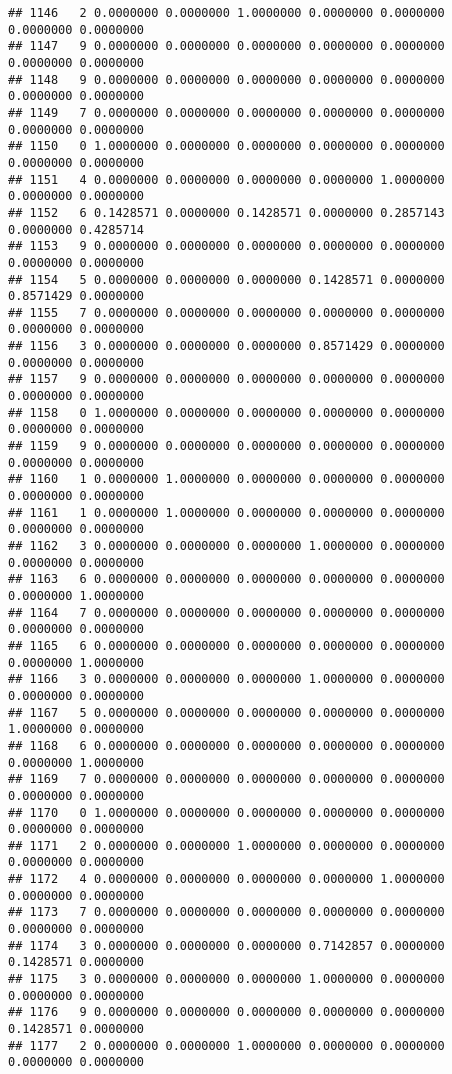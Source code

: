 \documentclass[
]{article}
\begin{document}
\begin{verbatim}
## 1146   2 0.0000000 0.0000000 1.0000000 0.0000000 0.0000000 0.0000000 0.0000000
## 1147   9 0.0000000 0.0000000 0.0000000 0.0000000 0.0000000 0.0000000 0.0000000
## 1148   9 0.0000000 0.0000000 0.0000000 0.0000000 0.0000000 0.0000000 0.0000000
## 1149   7 0.0000000 0.0000000 0.0000000 0.0000000 0.0000000 0.0000000 0.0000000
## 1150   0 1.0000000 0.0000000 0.0000000 0.0000000 0.0000000 0.0000000 0.0000000
## 1151   4 0.0000000 0.0000000 0.0000000 0.0000000 1.0000000 0.0000000 0.0000000
## 1152   6 0.1428571 0.0000000 0.1428571 0.0000000 0.2857143 0.0000000 0.4285714
## 1153   9 0.0000000 0.0000000 0.0000000 0.0000000 0.0000000 0.0000000 0.0000000
## 1154   5 0.0000000 0.0000000 0.0000000 0.1428571 0.0000000 0.8571429 0.0000000
## 1155   7 0.0000000 0.0000000 0.0000000 0.0000000 0.0000000 0.0000000 0.0000000
## 1156   3 0.0000000 0.0000000 0.0000000 0.8571429 0.0000000 0.0000000 0.0000000
## 1157   9 0.0000000 0.0000000 0.0000000 0.0000000 0.0000000 0.0000000 0.0000000
## 1158   0 1.0000000 0.0000000 0.0000000 0.0000000 0.0000000 0.0000000 0.0000000
## 1159   9 0.0000000 0.0000000 0.0000000 0.0000000 0.0000000 0.0000000 0.0000000
## 1160   1 0.0000000 1.0000000 0.0000000 0.0000000 0.0000000 0.0000000 0.0000000
## 1161   1 0.0000000 1.0000000 0.0000000 0.0000000 0.0000000 0.0000000 0.0000000
## 1162   3 0.0000000 0.0000000 0.0000000 1.0000000 0.0000000 0.0000000 0.0000000
## 1163   6 0.0000000 0.0000000 0.0000000 0.0000000 0.0000000 0.0000000 1.0000000
## 1164   7 0.0000000 0.0000000 0.0000000 0.0000000 0.0000000 0.0000000 0.0000000
## 1165   6 0.0000000 0.0000000 0.0000000 0.0000000 0.0000000 0.0000000 1.0000000
## 1166   3 0.0000000 0.0000000 0.0000000 1.0000000 0.0000000 0.0000000 0.0000000
## 1167   5 0.0000000 0.0000000 0.0000000 0.0000000 0.0000000 1.0000000 0.0000000
## 1168   6 0.0000000 0.0000000 0.0000000 0.0000000 0.0000000 0.0000000 1.0000000
## 1169   7 0.0000000 0.0000000 0.0000000 0.0000000 0.0000000 0.0000000 0.0000000
## 1170   0 1.0000000 0.0000000 0.0000000 0.0000000 0.0000000 0.0000000 0.0000000
## 1171   2 0.0000000 0.0000000 1.0000000 0.0000000 0.0000000 0.0000000 0.0000000
## 1172   4 0.0000000 0.0000000 0.0000000 0.0000000 1.0000000 0.0000000 0.0000000
## 1173   7 0.0000000 0.0000000 0.0000000 0.0000000 0.0000000 0.0000000 0.0000000
## 1174   3 0.0000000 0.0000000 0.0000000 0.7142857 0.0000000 0.1428571 0.0000000
## 1175   3 0.0000000 0.0000000 0.0000000 1.0000000 0.0000000 0.0000000 0.0000000
## 1176   9 0.0000000 0.0000000 0.0000000 0.0000000 0.0000000 0.1428571 0.0000000
## 1177   2 0.0000000 0.0000000 1.0000000 0.0000000 0.0000000 0.0000000 0.0000000

\end{verbatim}
\end{document}

